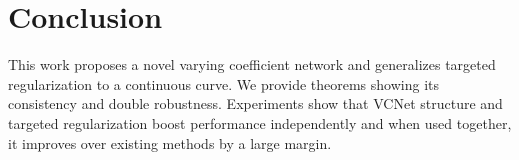 
\section{Conclusion}\label{sec:conclusion}
This work proposes a novel varying coefficient network and generalizes targeted regularization to a continuous curve. We provide theorems showing its consistency and double robustness. Experiments show that VCNet structure and targeted regularization boost performance independently and when used together, it improves over existing methods by a large margin. 
